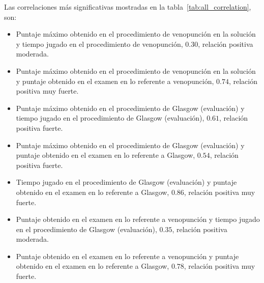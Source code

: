 
Las correlaciones  más significativas mostradas en la 
tabla~\ref{tab:all_correlation}, son:

\begin{itemize}
	\item Puntaje máximo obtenido en el procedimiento de venopunción en la solución y tiempo  
	jugado en el procedimiento de venopunción, $0.30$, relación positiva moderada.
	\item Puntaje máximo obtenido en el procedimiento de venopunción en la solución y puntaje 
	obtenido en el examen en lo referente a venopunción, $0.74$, relación positiva muy fuerte.
	\item Puntaje máximo obtenido en el procedimiento de Glasgow (evaluación) y tiempo 
	jugado en el procedimiento de Glasgow (evaluación), $0.61$, relación positiva fuerte.
	\item Puntaje máximo obtenido en el procedimiento de Glasgow (evaluación) y puntaje obtenido en 
	el examen en lo referente a Glasgow, $0.54$, relación positiva fuerte.
	\item Tiempo jugado en el procedimiento de Glasgow (evaluación) y puntaje obtenido en el 
	examen en lo referente a Glasgow, $0.86$, relación positiva muy fuerte.
	\item Puntaje obtenido en el examen en lo referente a venopunción y tiempo jugado en el 
	procedimiento de Glasgow (evaluación), $0.35$, relación positiva moderada.
	\item Puntaje obtenido en el examen en lo referente a venopunción y puntaje obtenido en el examen 
	en lo referente a Glasgow, $0.78$, relación positiva muy fuerte.
\end{itemize}


%

